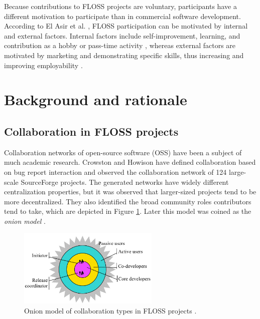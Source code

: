 Because contributions to FLOSS projects are voluntary, participants have a different motivation to participate than in commercial software development. According to El Asir et al. \cite{elasriPeripheryCoreTemporal2017}, FLOSS participation can be motivated by internal and external factors. Internal factors include self-improvement, learning, and contribution as a hobby or pass-time activity  \cite{alexanderharsWorkingFreeMotivations2002,yunwenyeUnderstandingMotivationOpen2003}, whereas external factors are motivated by marketing and demonstrating specific skills, thus increasing and improving employability \cite{alexanderharsWorkingFreeMotivations2002}.

\section{Background and rationale}

\subsection{Collaboration in FLOSS projects}
Collaboration networks of open-source software (OSS) have been a subject of much academic research. Crowston and Howison \cite{crowstonSocialStructureFree2005} have defined collaboration based on bug report interaction and observed the collaboration network of 124 large-scale SourceForge projects. The generated networks have widely different centralization properties, but it was observed that larger-sized projects tend to be more decentralized. They also identified the broad community roles contributors tend to take, which are depicted in Figure \ref{fig:onion1}. Later this model was coined as the \textit{onion model} \cite{martinez-romoUsingSocialNetwork2008}.

\begin{figure}
    \centering
    \includegraphics[width=0.6\textwidth]{figures/onion_model.png}
    \caption{Onion model of collaboration types in FLOSS projects \cite{crowstonSocialStructureFree2005}.}
    \label{fig:onion1}
\end{figure}

